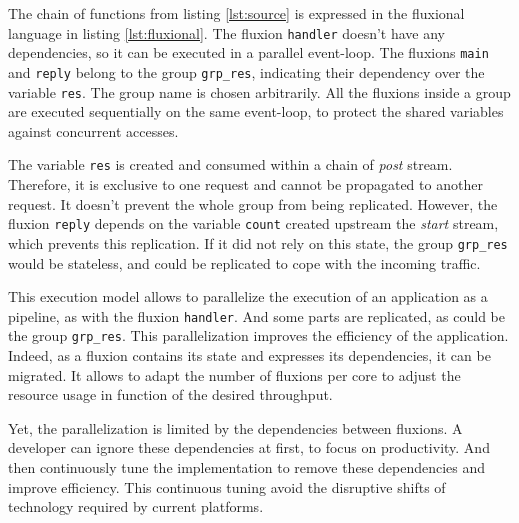 The chain of functions from listing \ref{lst:source} is expressed in the fluxional language in listing \ref{lst:fluxional}.
The fluxion \texttt{handler} doesn't have any dependencies, so it can be executed in a parallel event-loop.
The fluxions \texttt{main} and \texttt{reply} belong to the group \texttt{grp\_res}, indicating their dependency over the variable \texttt{res}.
The group name is chosen arbitrarily.
All the fluxions inside a group are executed sequentially on the same event-loop, to protect the shared variables against concurrent accesses.

The variable \texttt{res} is created and consumed within a chain of \textit{post} stream.
Therefore, it is exclusive to one request and cannot be propagated to another request.
It doesn't prevent the whole group from being replicated.
However, the fluxion \texttt{reply} depends on the variable \texttt{count} created upstream the \textit{start} stream, which prevents this replication.
If it did not rely on this state, the group \texttt{grp\_res} would be stateless, and could be replicated to cope with the incoming traffic.

\separator

This execution model allows to parallelize the execution of an application as a pipeline, as with the fluxion \texttt{handler}.
And some parts are replicated, as could be the group \texttt{grp\_res}.
This parallelization improves the efficiency of the application.
Indeed, as a fluxion contains its state and expresses its dependencies, it can be migrated.
It allows to adapt the number of fluxions per core to adjust the resource usage in function of the desired throughput.

Yet, the parallelization is limited by the dependencies between fluxions.
A developer can ignore these dependencies at first, to focus on productivity.
And then continuously tune the implementation to remove these dependencies and improve efficiency.
This continuous tuning avoid the disruptive shifts of technology required by current platforms.